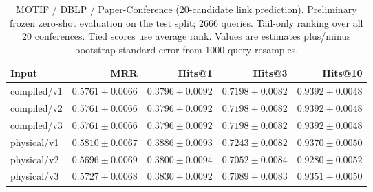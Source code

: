 \begin{table}[t]
\centering
\small
\begin{tabular}{lrrrr}
\toprule
Input & MRR & Hits@1 & Hits@3 & Hits@10 \\
\midrule
compiled/v1 & $0.5761 \pm 0.0066$ & $0.3796 \pm 0.0092$ & $0.7198 \pm 0.0082$ & $0.9392 \pm 0.0048$ \\
compiled/v2 & $0.5761 \pm 0.0066$ & $0.3796 \pm 0.0092$ & $0.7198 \pm 0.0082$ & $0.9392 \pm 0.0048$ \\
compiled/v3 & $0.5761 \pm 0.0066$ & $0.3796 \pm 0.0092$ & $0.7198 \pm 0.0082$ & $0.9392 \pm 0.0048$ \\
physical/v1 & $0.5810 \pm 0.0067$ & $0.3886 \pm 0.0093$ & $0.7243 \pm 0.0082$ & $0.9370 \pm 0.0050$ \\
physical/v2 & $0.5696 \pm 0.0069$ & $0.3800 \pm 0.0094$ & $0.7052 \pm 0.0084$ & $0.9280 \pm 0.0052$ \\
physical/v3 & $0.5727 \pm 0.0068$ & $0.3830 \pm 0.0092$ & $0.7089 \pm 0.0083$ & $0.9351 \pm 0.0050$ \\
\bottomrule
\end{tabular}
\caption{MOTIF / DBLP / Paper-Conference (20-candidate link prediction). Preliminary frozen zero-shot evaluation on the test split; 2666 queries. Tail-only ranking over all 20 conferences. Tied scores use average rank. Values are estimates plus/minus bootstrap standard error from 1000 query resamples.}
\label{tab:motif-paper_conference-link_prediction}
\end{table}
